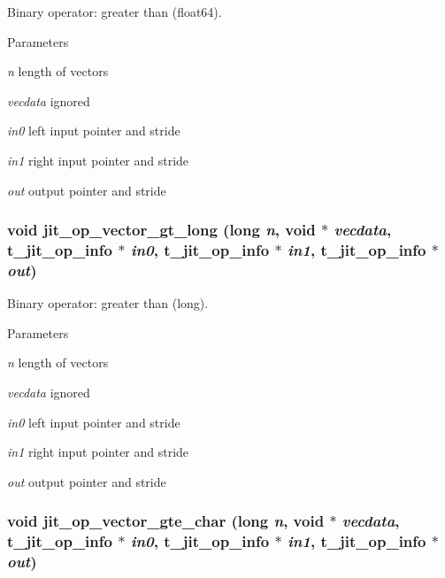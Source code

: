 Binary operator: greater than (float64). 
\begin{DoxyParams}{Parameters}
\item[{\em n}]length of vectors \item[{\em vecdata}]ignored \item[{\em in0}]left input pointer and stride \item[{\em in1}]right input pointer and stride \item[{\em out}]output pointer and stride \end{DoxyParams}
\hypertarget{group__opvecmod_ga459487a4b3d6adca2f44ddb7e39037ba}{
\subsubsection[{jit\_\-op\_\-vector\_\-gt\_\-long}]{\setlength{\rightskip}{0pt plus 5cm}void jit\_\-op\_\-vector\_\-gt\_\-long (long {\em n}, \/  void $\ast$ {\em vecdata}, \/  {\bf t\_\-jit\_\-op\_\-info} $\ast$ {\em in0}, \/  {\bf t\_\-jit\_\-op\_\-info} $\ast$ {\em in1}, \/  {\bf t\_\-jit\_\-op\_\-info} $\ast$ {\em out})}}
\label{group__opvecmod_ga459487a4b3d6adca2f44ddb7e39037ba}


Binary operator: greater than (long). 
\begin{DoxyParams}{Parameters}
\item[{\em n}]length of vectors \item[{\em vecdata}]ignored \item[{\em in0}]left input pointer and stride \item[{\em in1}]right input pointer and stride \item[{\em out}]output pointer and stride \end{DoxyParams}
\hypertarget{group__opvecmod_ga5dce1f9d51fe30b8d600551f0f792b10}{
\subsubsection[{jit\_\-op\_\-vector\_\-gte\_\-char}]{\setlength{\rightskip}{0pt plus 5cm}void jit\_\-op\_\-vector\_\-gte\_\-char (long {\em n}, \/  void $\ast$ {\em vecdata}, \/  {\bf t\_\-jit\_\-op\_\-info} $\ast$ {\em in0}, \/  {\bf t\_\-jit\_\-op\_\-info} $\ast$ {\em in1}, \/  {\bf t\_\-jit\_\-op\_\-info} $\ast$ {\em out})}}
\label{group__opvecmod_ga5dce1f9d51fe30b8d600551f0f792b10}



